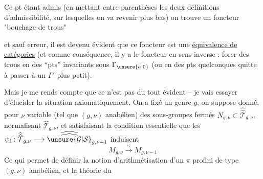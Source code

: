 Ce pt étant admis (en mettant
entre parenthèses les deux définitions
 d'admissibilité, sur lesquelles
on va revenir plus bas) on trouve
un foncteur "bouchage de trous"



et sauf erreur, il est devenu évident
que ce foncteur est une \uline{équivalence de
catégories} (et comme conséquence, il
y a le foncteur en sens inverse :
forer des trous en des ``pts'' invariants
sous $\Gamma_{\unsure{a|0}}$ (ou en des pts quelconques
quitte à passer à un $\Gamma'$ plus petit).

Mais je me rends compte que
 ce n'est pas du tout évident -- je vais
essayer d'élucider la situation axiomatiquement.
On a fixé un genre $g$,
on suppose donné, pour $\nu$ variable
(tel que $(g,\nu)$ anabélien) des
sous-groupes fermés $N_{g,\nu}\subset\widehat{\widehat{\mathcal T}}_{g,\nu}$,
normalisant $\widehat{\mathcal T}_{g,\nu}$, et satisfaisant la
condition essentielle que les $\psi_i:\widehat{\widehat{\mathcal T}}_{g,\nu}\longrightarrow\widehat{\widehat{\unsure{\mathcal G|\mathcal S}}}_{g,\nu-1}$
induisent
\[
M_{g,\nu}\xrightarrow{\sim}M_{g,\nu-1}
\]
Ce qui permet de définir la notion
d'arithmétisation d'un $\pi$ profini de
type $(g,\nu)$ anabélien, et la théorie du

